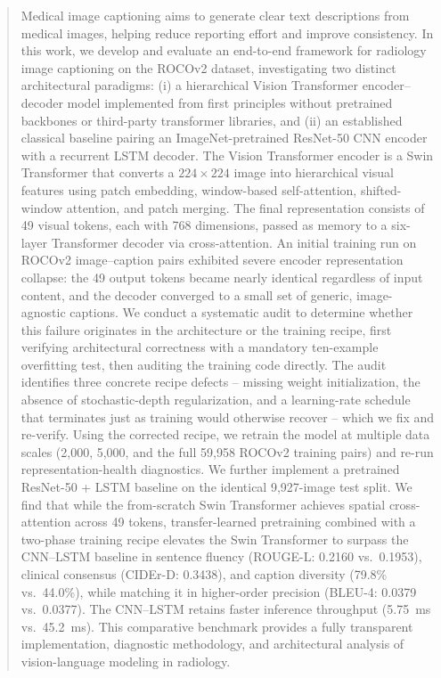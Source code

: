\documentclass[conference]{IEEEtran}
\begin{document}
\begin{abstract}
Medical image captioning aims to generate clear text descriptions from medical images, helping reduce reporting effort and improve consistency. In this work, we develop and evaluate an end-to-end framework for radiology image captioning on the ROCOv2 dataset, investigating two distinct architectural paradigms: (i) a hierarchical Vision Transformer encoder--decoder model implemented from first principles without pretrained backbones or third-party transformer libraries, and (ii) an established classical baseline pairing an ImageNet-pretrained ResNet-50 CNN encoder with a recurrent LSTM decoder. The Vision Transformer encoder is a Swin Transformer that converts a $224\times224$ image into hierarchical visual features using patch embedding, window-based self-attention, shifted-window attention, and patch merging. The final representation consists of 49 visual tokens, each with 768 dimensions, passed as memory to a six-layer Transformer decoder via cross-attention. An initial training run on ROCOv2 image--caption pairs exhibited severe encoder representation collapse: the 49 output tokens became nearly identical regardless of input content, and the decoder converged to a small set of generic, image-agnostic captions. We conduct a systematic audit to determine whether this failure originates in the architecture or the training recipe, first verifying architectural correctness with a mandatory ten-example overfitting test, then auditing the training code directly. The audit identifies three concrete recipe defects -- missing weight initialization, the absence of stochastic-depth regularization, and a learning-rate schedule that terminates just as training would otherwise recover -- which we fix and re-verify. Using the corrected recipe, we retrain the model at multiple data scales (2,000, 5,000, and the full 59,958 ROCOv2 training pairs) and re-run representation-health diagnostics. We further implement a pretrained ResNet-50 + LSTM baseline on the identical 9,927-image test split. We find that while the from-scratch Swin Transformer achieves spatial cross-attention across 49 tokens, transfer-learned pretraining combined with a two-phase training recipe elevates the Swin Transformer to surpass the CNN--LSTM baseline in sentence fluency (ROUGE-L: 0.2160 vs.\ 0.1953), clinical consensus (CIDEr-D: 0.3438), and caption diversity (79.8\% vs.\ 44.0\%), while matching it in higher-order precision (BLEU-4: 0.0379 vs.\ 0.0377). The CNN--LSTM retains faster inference throughput (5.75~ms vs.\ 45.2~ms). This comparative benchmark provides a fully transparent implementation, diagnostic methodology, and architectural analysis of vision-language modeling in radiology.
\end{abstract}
\end{document}
